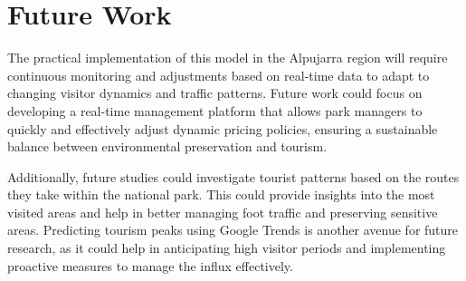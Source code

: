 \documentclass[12pt]{book}
\begin{document}
\section{Future Work}

The practical implementation of this model in the Alpujarra region will require continuous monitoring and adjustments based on real-time data to adapt to changing visitor dynamics and traffic patterns. Future work could focus on developing a real-time management platform that allows park managers to quickly and effectively adjust dynamic pricing policies, ensuring a sustainable balance between environmental preservation and tourism.

Additionally, future studies could investigate tourist patterns based on the routes they take within the national park. This could provide insights into the most visited areas and help in better managing foot traffic and preserving sensitive areas. Predicting tourism peaks using Google Trends is another avenue for future research, as it could help in anticipating high visitor periods and implementing proactive measures to manage the influx effectively.
\end{document}
